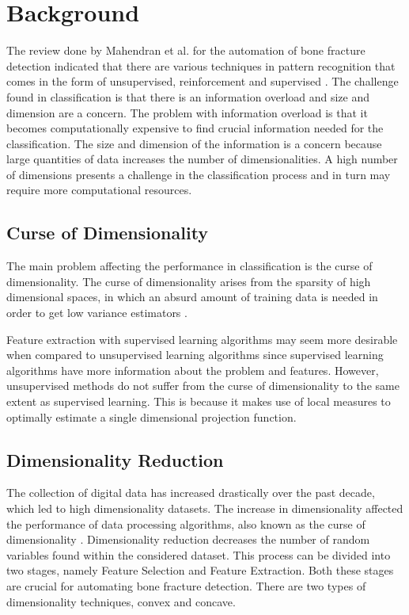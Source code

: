 \documentclass[11pt]{article}
\begin{document}
	\section{Background}
	\label{sc: Background}
	The review done by Mahendran et al. for the automation of bone fracture detection indicated that there are various techniques in pattern recognition that comes in the form of unsupervised, reinforcement and supervised \cite{Mahendran2011}. The challenge found in classification is that there is an information overload and size and dimension are a concern. The problem with information overload is that it becomes computationally expensive to find crucial information needed for the classification. The size and dimension of the information is a concern because large quantities of data increases the number of dimensionalities. A high number of dimensions presents a challenge in the classification process and in turn may require more computational resources.
	
	\subsection{Curse of Dimensionality}
	The main problem affecting the performance in classification is the curse of dimensionality. The curse of dimensionality arises from the sparsity of high dimensional spaces, in which an absurd amount of training data is needed in order to get low variance  estimators \cite{intrator_feature_1992}.
	
	Feature extraction with supervised learning algorithms may seem more desirable when compared to unsupervised learning algorithms since supervised learning algorithms have more information about the problem and features. However, unsupervised methods do not suffer from the curse of dimensionality to the same extent as supervised learning. This is because it makes use of local measures to optimally estimate a single dimensional projection  function\cite{intrator_feature_1992}.
	
	\subsection{Dimensionality Reduction}
	The collection of digital data has increased drastically over the past decade, which led to high dimensionality datasets. The increase in dimensionality affected the performance of data processing algorithms, also known as the curse of dimensionality \cite{Center2002}. Dimensionality reduction decreases the number of random variables found within the considered dataset. This process can be divided into two stages, namely Feature Selection and Feature Extraction. Both these stages are crucial for automating bone fracture detection. There are two types of dimensionality techniques, convex and concave. 
	
\end{document}
